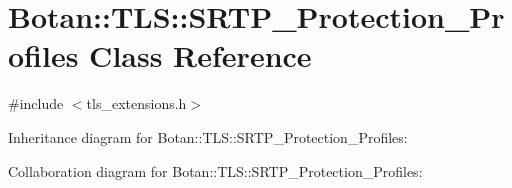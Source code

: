 \hypertarget{class_botan_1_1_t_l_s_1_1_s_r_t_p___protection___profiles}{}\section{Botan\+:\+:T\+LS\+:\+:S\+R\+T\+P\+\_\+\+Protection\+\_\+\+Profiles Class Reference}
\label{class_botan_1_1_t_l_s_1_1_s_r_t_p___protection___profiles}


{\ttfamily \#include $<$tls\+\_\+extensions.\+h$>$}



Inheritance diagram for Botan\+:\+:T\+LS\+:\+:S\+R\+T\+P\+\_\+\+Protection\+\_\+\+Profiles\+:


Collaboration diagram for Botan\+:\+:T\+LS\+:\+:S\+R\+T\+P\+\_\+\+Protection\+\_\+\+Profiles\+:

